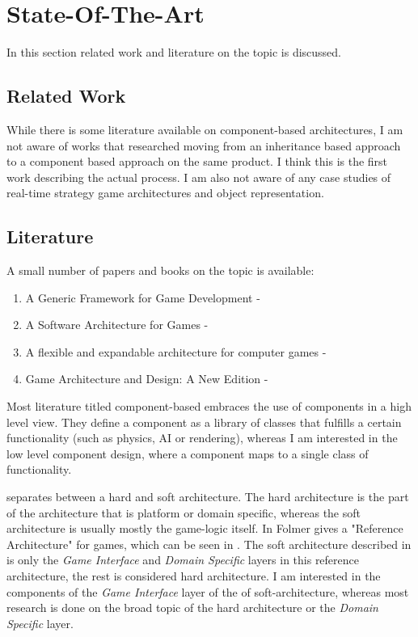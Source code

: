 \section{State-Of-The-Art}
In this section related work and literature on the topic is discussed.

\subsection{Related Work}
While there is some literature available on component-based architectures, I am not aware of works that researched
moving from an inheritance based approach to a component based approach on the same product. I think this is the first
work describing the actual process. I am also not aware of any case studies of \OS{} real-time strategy game
architectures and object representation.

\pagebreak

\subsection{Literature}
A small number of papers and books on the topic is available:
\begin{enumerate}
    \item A Generic Framework for Game Development - \cite{Fh02ageneric}
    \item A Software Architecture for Games - \cite{Doherty_2003}
    \item A flexible and expandable architecture for computer games - \cite{Plummer_2004}
    \item Game Architecture and Design: A New Edition - \cite{Rollings.2003}
\end{enumerate}

Most literature titled component-based embraces the use of components in a high level view. They define a component
as a library of classes that fulfills a certain functionality (such as physics, AI or rendering), whereas I am
interested in the low level component design, where a component maps to a single class of functionality.

\cite{Rollings.2003} separates between a hard and soft architecture. The hard architecture is the part of the
architecture that is platform or domain specific, whereas the soft architecture is usually mostly the game-logic itself.
In \cite{springerlink:10.1007/978-3-540-73551-95} Folmer gives a "Reference Architecture" for games, which can be seen in
. The soft architecture described in \cite{Rollings.2003} is only the \textit{Game Interface}
and \textit{Domain Specific} layers in this reference architecture, the rest is considered hard architecture. I am
interested in the components of the \textit{Game Interface} layer of the of soft-architecture, whereas most
research is done on the broad topic of the hard architecture or the \textit{Domain Specific} layer.

